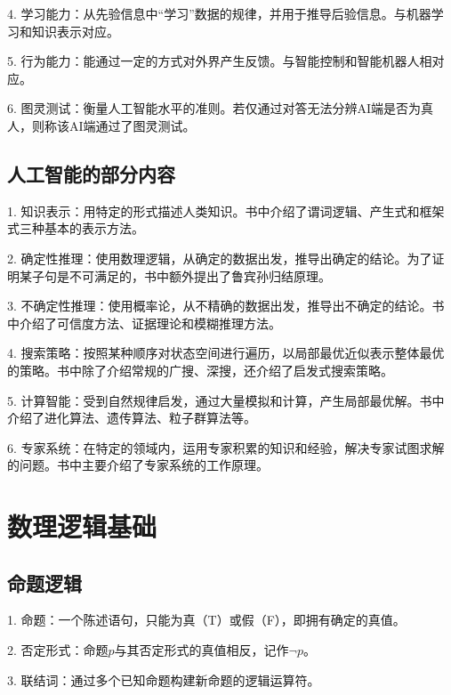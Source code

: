 4. 学习能力：从先验信息中“学习”数据的规律，并用于推导后验信息。与机器学习和知识表示对应。

5. 行为能力：能通过一定的方式对外界产生反馈。与智能控制和智能机器人相对应。

6. 图灵测试：衡量人工智能水平的准则。若仅通过对答无法分辨AI端是否为真人，则称该AI端通过了图灵测试。

\subsection{人工智能的部分内容}

1. 知识表示：用特定的形式描述人类知识。书中介绍了谓词逻辑、产生式和框架式三种基本的表示方法。

2. 确定性推理：使用数理逻辑，从确定的数据出发，推导出确定的结论。为了证明某子句是不可满足的，书中额外提出了鲁宾孙归结原理。

3. 不确定性推理：使用概率论，从不精确的数据出发，推导出不确定的结论。书中介绍了可信度方法、证据理论和模糊推理方法。

4. 搜索策略：按照某种顺序对状态空间进行遍历，以局部最优近似表示整体最优的策略。书中除了介绍常规的广搜、深搜，还介绍了启发式搜索策略。

5. 计算智能：受到自然规律启发，通过大量模拟和计算，产生局部最优解。书中介绍了进化算法、遗传算法、粒子群算法等。

6. 专家系统：在特定的领域内，运用专家积累的知识和经验，解决专家试图求解的问题。书中主要介绍了专家系统的工作原理。

\section{数理逻辑基础}

\begin{tcolorbox}[colback=red!5,colframe=red!75!black]
\end{tcolorbox}

\subsection{命题逻辑}

1. 命题：一个陈述语句，只能为真（T）或假（F），即拥有确定的真值。

2. 否定形式：命题$p$与其否定形式的真值相反，记作$\neg p$。

3. 联结词：通过多个已知命题构建新命题的逻辑运算符。

